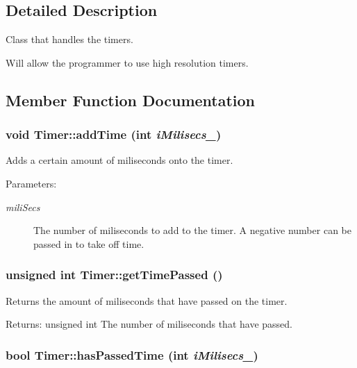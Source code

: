 \subsection{Detailed Description}
Class that handles the timers. 

Will allow the programmer to use high resolution timers. 

\subsection{Member Function Documentation}
\hypertarget{class_timer_a79670d8a0acb6167254966c763a747c}{
\subsubsection[{addTime}]{\setlength{\rightskip}{0pt plus 5cm}void Timer::addTime (int {\em iMilisecs\_\-})}}
\label{class_timer_a79670d8a0acb6167254966c763a747c}


Adds a certain amount of miliseconds onto the timer. 

\begin{Desc}
\item[Parameters:]
\begin{description}
\item[{\em miliSecs}]The number of miliseconds to add to the timer. A negative number can be passed in to take off time. \end{description}
\end{Desc}
\hypertarget{class_timer_990f0a0980e5e9dc46f7743d378cce9f}{
\subsubsection[{getTimePassed}]{\setlength{\rightskip}{0pt plus 5cm}unsigned int Timer::getTimePassed ()}}
\label{class_timer_990f0a0980e5e9dc46f7743d378cce9f}


Returns the amount of miliseconds that have passed on the timer. 

\begin{Desc}
\item[Returns:]unsigned int The number of miliseconds that have passed. \end{Desc}
\hypertarget{class_timer_f4e764bae73f87c413e76ec640a8bdd2}{
\subsubsection[{hasPassedTime}]{\setlength{\rightskip}{0pt plus 5cm}bool Timer::hasPassedTime (int {\em iMilisecs\_\-})}}
\label{class_timer_f4e764bae73f87c413e76ec640a8bdd2}


